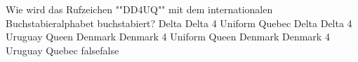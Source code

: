     {Wie wird das Rufzeichen ""DD4UQ"" mit dem internationalen Buchstabieralphabet  buchstabiert?}
    {Delta Delta 4 Uniform Quebec}
    {Delta Delta 4 Uruguay Queen}
    {Denmark Denmark 4 Uniform Queen}
    {Denmark Denmark 4 Uruguay Quebec}
    {false}{false}